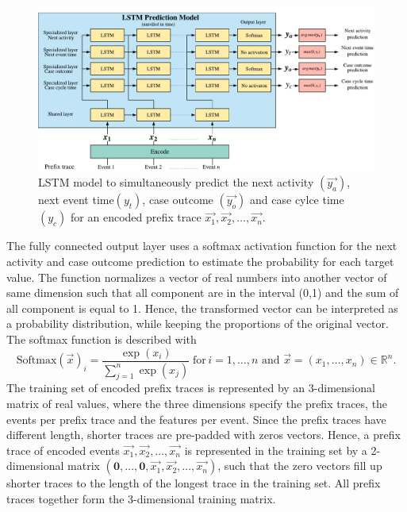 \begin{figure}[!htbp]
	\centering
	\includegraphics[width=\textwidth]{figures/network}
	\caption{LSTM model to simultaneously predict the next activity $(\vec{y_a})$, next event time$(y_t)$, case outcome $(\vec{y_o})$ and case cylce time $(y_c)$ for an encoded prefix trace $\vec{x_1}, \vec{x_2}, \dots, \vec{x_n}$.}
	\label{fig:network}
\end{figure}

The fully connected output layer uses a softmax activation function for the next activity and case outcome prediction to estimate the probability for each target value.
The function normalizes a vector of real numbers into another vector of same dimension such that all component are in the interval (0,1) and the sum of all component is equal to 1.
Hence, the transformed vector can be interpreted as a probability distribution, while keeping the proportions of the original vector.
The softmax function is described with
\begin{equation*}\label{key}
	\text{Softmax}(\vec{x})_i = \frac{\exp(x_i)}{\sum_{j=1}^{n} \exp(x_j)}  \; \text{for} \, i = 1, \dots, n \text{ and } \vec{x}=(x_1, \dots, x_n) \in \mathbb{R}^n.
\end{equation*}
The training set of encoded prefix traces is represented by an 3-dimensional matrix of real values, where the three dimensions specify the prefix traces, the events per prefix trace and the features per event.
Since the prefix traces have different length, shorter traces are pre-padded \cite{DBLP:journals/corr/abs-1903-07288} with zeros vectors.
Hence, a prefix trace of encoded events $\vec{x_1}, \vec{x_2}, \dots, \vec{x_n}$  is represented in the training set by a 2-dimensional matrix $(\mathbf{0}, \dots, \mathbf{0},\vec{x_1}, \vec{x_2}, \dots, \vec{x_n})$, such that the zero vectors fill up shorter traces to the length of the longest trace in the training set.
All prefix traces together form the 3-dimensional training matrix.

